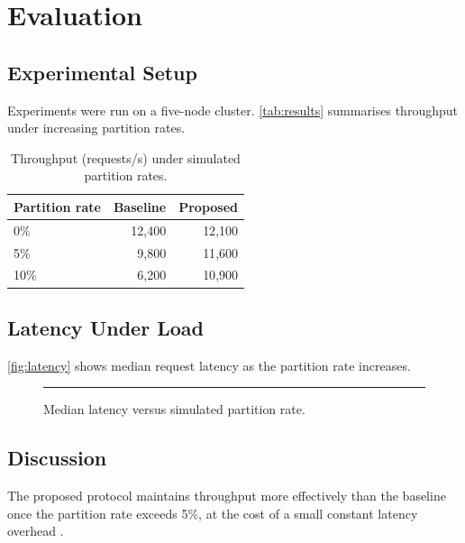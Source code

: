 \chapter{Evaluation}
\label{ch:evaluation}

\section{Experimental Setup}

Experiments were run on a five-node cluster. \autoref{tab:results}
summarises throughput under increasing partition rates.

\begin{table}[htbp]
  \centering
  \caption{Throughput (requests/s) under simulated partition rates.}
  \label{tab:results}
  \begin{tabular}{@{}lrr@{}}
    \toprule
    Partition rate & Baseline & Proposed \\
    \midrule
    0\%  & 12{,}400 & 12{,}100 \\
    5\%  & 9{,}800  & 11{,}600 \\
    10\% & 6{,}200  & 10{,}900 \\
    \bottomrule
  \end{tabular}
\end{table}

\section{Latency Under Load}

\autoref{fig:latency} shows median request latency as the partition
rate increases.

\begin{figure}[htbp]
  \centering
  \rule{0.6\textwidth}{4cm}
  \caption{Median latency versus simulated partition rate.}
  \label{fig:latency}
\end{figure}

\section{Discussion}

The proposed protocol maintains throughput more effectively than the
baseline once the partition rate exceeds 5\%, at the cost of a small
constant latency overhead \citep{ongaro2014search}.
